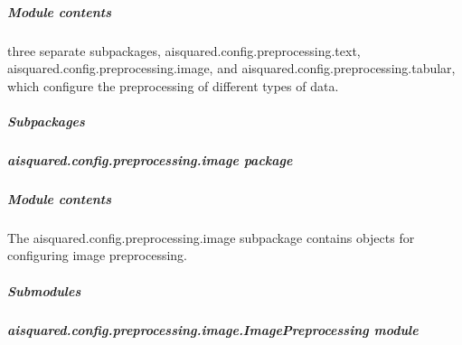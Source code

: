 \documentclass[letterpaper,10pt,english]{sphinxmanual}
\begin{document}
\subparagraph{Module contents}
\label{\detokenize{aisquared.config.preprocessing:module-aisquared.config.preprocessing}}\label{\detokenize{aisquared.config.preprocessing:module-contents}}\begin{description}
\sphinxAtStartPar
three separate subpackages, aisquared.config.preprocessing.text, aisquared.config.preprocessing.image, and aisquared.config.preprocessing.tabular, which configure the preprocessing of different types of data.

\end{description}


\subparagraph{Subpackages}
\label{\detokenize{aisquared.config.preprocessing:subpackages}}
\sphinxstepscope


\subparagraph{aisquared.config.preprocessing.image package}
\label{\detokenize{aisquared.config.preprocessing.image:aisquared-config-preprocessing-image-package}}\label{\detokenize{aisquared.config.preprocessing.image::doc}}

\subparagraph{Module contents}
\label{\detokenize{aisquared.config.preprocessing.image:module-aisquared.config.preprocessing.image}}\label{\detokenize{aisquared.config.preprocessing.image:module-contents}}
\sphinxAtStartPar
The aisquared.config.preprocessing.image subpackage contains objects for configuring image preprocessing.


\subparagraph{Submodules}
\label{\detokenize{aisquared.config.preprocessing.image:submodules}}

\subparagraph{aisquared.config.preprocessing.image.ImagePreprocessing module}
\label{\detokenize{aisquared.config.preprocessing.image:module-aisquared.config.preprocessing.image.ImagePreprocessing}}\label{\detokenize{aisquared.config.preprocessing.image:aisquared-config-preprocessing-image-imagepreprocessing-module}}
\end{document}
